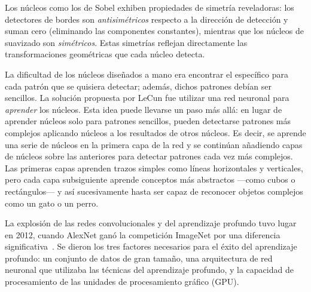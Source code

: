 Los n\'ucleos como los de Sobel exhiben propiedades de simetr\'ia reveladoras:
los detectores de bordes son \emph{antisim\'etricos} respecto a la direcci\'on
de detecci\'on y suman cero (eliminando las componentes constantes), mientras
que los n\'ucleos de suavizado son \emph{sim\'etricos}. Estas simetr\'ias
reflejan directamente las transformaciones geom\'etricas que cada n\'ucleo
detecta.

La dificultad de los n\'ucleos dise\~nados a mano era encontrar el espec\'ifico
para cada patr\'on que se quisiera detectar; adem\'as, dichos patrones deb\'ian
ser sencillos. La soluci\'on propuesta por LeCun fue utilizar una red neuronal
para \emph{aprender} los n\'ucleos. Esta idea puede llevarse un paso m\'as
all\'a: en lugar de aprender n\'ucleos solo para patrones sencillos, pueden
detectarse patrones m\'as complejos aplicando n\'ucleos a los resultados de
otros n\'ucleos. Es decir, se aprende una serie de n\'ucleos en la primera capa
de la red y se contin\'uan a\~nadiendo capas de n\'ucleos sobre las anteriores
para detectar patrones cada vez m\'as complejos. Las primeras capas aprenden
trazos simples como l\'ineas horizontales y verticales, pero cada capa
subsiguiente aprende conceptos m\'as abstractos ---como cubos o
rect\'angulos--- y as\'i sucesivamente hasta ser capaz de reconocer objetos
complejos como un gato o un perro.

La explosi\'on de las redes convolucionales y del aprendizaje profundo tuvo
lugar en 2012, cuando AlexNet gan\'o la competici\'on ImageNet por una
diferencia significativa~\citep{krizhevsky2012alexnet}. Se dieron los tres
factores necesarios para el \'exito del aprendizaje profundo: un conjunto de
datos de gran tama\~no, una arquitectura de red neuronal que utilizaba las
t\'ecnicas del aprendizaje profundo, y la capacidad de procesamiento de las
unidades de procesamiento gr\'afico (GPU).

